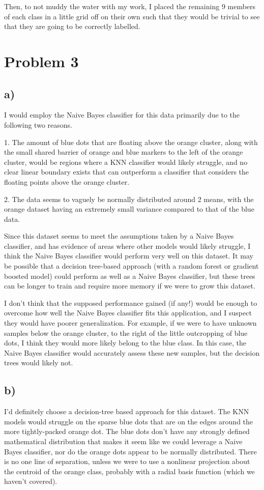 \documentclass[12pt]{article}
\begin{document}
Then, to not muddy the water with my work, I placed the remaining 9 members of each class in a little grid off on their own 
such that they would be trivial to see that they are going to be correctly labelled.

\section{Problem 3}
\subsection{a)}
I would employ the Naive Bayes classifier for this data primarily due to the following two reasons.

1. The amount of blue dots that are floating above the 
orange cluster, along with the small shared barrier of orange and blue markers to the left of the orange cluster, would 
be regions where a KNN classifier would likely struggle, and no clear linear boundary exists that can outperform a classifier
that considers the floating points above the orange cluster. 

2. The data seems to vaguely be normally distributed around 2 means, with the orange dataset having an extremely small 
variance compared to that of the blue data.


Since this dataset seems to meet the assumptions taken by a Naive Bayes classifier, and has evidence of areas where other 
models would likely struggle, I think the Naive Bayes classifier would perform very well on this dataset. It may be possible 
that a decision tree-based approach (with a random forest or gradient boosted model) could perform as well as a Naive Bayes
classifier, but these trees can be longer to train and require more memory if we were to grow this dataset. 

I don't think 
that the supposed performance gained (if any!) would be enough to overcome how well the Naive Bayes classifier fits this 
application, and I suspect they would have poorer generalization. For example, if we were to have unknown samples below the
orange cluster, to the right of the little outcropping of blue dots, I think they would more likely belong to the blue class.
In this case, the Naive Bayes classifier would accurately assess these new samples, but the decision trees would likely not.


\subsection{b)}
I'd definitely choose a decision-tree based approach for this dataset. The KNN models would struggle on the sparse blue 
dots that are on the edges around the more tightly-packed orange dot. The blue dots don't have any strongly defined 
mathematical distribution that makes it seem like we could leverage a Naive Bayes classifier, nor do the orange dots appear
to be normally distributed. There is no one line of separation, unless we were to use a nonlinear projection about the centroid
of the orange class, probably with a radial basis function (which we haven't covered).
\end{document}
